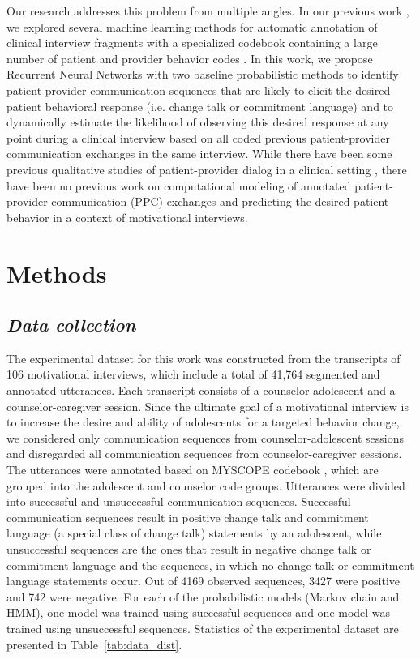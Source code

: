 \documentclass{amia_summit_2018}
\begin{document}
Our research addresses this problem from multiple angles. In our previous work \cite{kotov2015interpretable, hasan2016study}, we explored several machine learning methods for automatic annotation of clinical interview fragments with a specialized codebook containing a large number of patient and provider behavior codes \cite{carcone2013provider}. In this work, we propose Recurrent Neural Networks with two baseline probabilistic methods to identify patient-provider communication sequences that are likely to elicit the desired patient behavioral response (i.e. change talk or commitment language) and to dynamically estimate the likelihood of observing this desired response at any point during a clinical interview based on all coded previous patient-provider communication exchanges in the same interview. While there have been some previous qualitative studies of patient-provider dialog in a clinical setting \cite{eide2004physician}, there have been no previous work on computational modeling of annotated patient-provider communication (PPC) exchanges and predicting the desired patient behavior in a context of motivational interviews.   

\section*{Methods}
\subsection*{\textit{Data collection}}
The experimental dataset for this work was constructed from the transcripts of 106 motivational interviews, which include a total of 41,764 segmented and annotated utterances. Each transcript consists of a counselor-adolescent and a counselor-caregiver session. Since the ultimate goal of a motivational interview is to increase the desire and ability of adolescents for a targeted behavior change, we considered only communication sequences from counselor-adolescent sessions and disregarded all communication sequences from counselor-caregiver sessions. The utterances were annotated based on MYSCOPE codebook \cite{carcone2013provider}, which are grouped into the adolescent and counselor code groups. Utterances were divided into successful and unsuccessful communication sequences. Successful communication sequences result in positive change talk and commitment language (a special class of change talk) statements by an adolescent, while unsuccessful sequences are the ones that result in negative change talk or commitment language and the sequences, in which no change talk or commitment language statements occur. Out of 4169 observed sequences, 3427 were positive and 742 were negative. For each of the probabilistic models (Markov chain and HMM), one model was trained using successful sequences and one model was trained using unsuccessful sequences. Statistics of the experimental dataset are presented in Table~\ref{tab:data_dist}. \\
\end{document}
